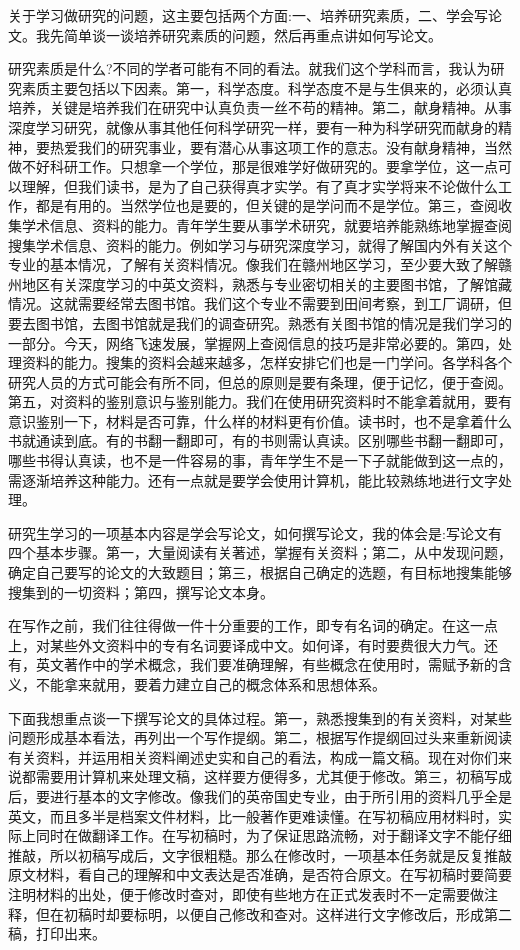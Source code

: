 \documentclass[11pt]{article}
\begin{document}
关于学习做研究的问题，这主要包括两个方面:一、培养研究素质，二、学会写论文。我先简单谈一谈培养研究素质的问题，然后再重点讲如何写论文。

研究素质是什么?不同的学者可能有不同的看法。就我们这个学科而言，我认为研究素质主要包括以下因素。第一，科学态度。科学态度不是与生俱来的，必须认真培养，关键是培养我们在研究中认真负责一丝不苟的精神。第二，献身精神。从事深度学习研究，就像从事其他任何科学研究一样，要有一种为科学研究而献身的精神，要热爱我们的研究事业，要有潜心从事这项工作的意志。没有献身精神，当然做不好科研工作。只想拿一个学位，那是很难学好做研究的。要拿学位，这一点可以理解，但我们读书，是为了自己获得真才实学。有了真才实学将来不论做什么工作，都是有用的。当然学位也是要的，但关键的是学问而不是学位。第三，查阅收集学术信息、资料的能力。青年学生要从事学术研究，就要培养能熟练地掌握查阅搜集学术信息、资料的能力。例如学习与研究深度学习，就得了解国内外有关这个专业的基本情况，了解有关资料情况。像我们在赣州地区学习，至少要大致了解赣州地区有关深度学习的中英文资料，熟悉与专业密切相关的主要图书馆，了解馆藏情况。这就需要经常去图书馆。我们这个专业不需要到田间考察，到工厂调研，但要去图书馆，去图书馆就是我们的调查研究。熟悉有关图书馆的情况是我们学习的一部分。今天，网络飞速发展，掌握网上查阅信息的技巧是非常必要的。第四，处理资料的能力。搜集的资料会越来越多，怎样安排它们也是一门学问。各学科各个研究人员的方式可能会有所不同，但总的原则是要有条理，便于记忆，便于查阅。第五，对资料的鉴别意识与鉴别能力。我们在使用研究资料时不能拿着就用，要有意识鉴别一下，材料是否可靠，什么样的材料更有价值。读书时，也不是拿着什么书就通读到底。有的书翻一翻即可，有的书则需认真读。区别哪些书翻一翻即可，哪些书得认真读，也不是一件容易的事，青年学生不是一下子就能做到这一点的，需逐渐培养这种能力。还有一点就是要学会使用计算机，能比较熟练地进行文字处理。

研究生学习的一项基本内容是学会写论文，如何撰写论文，我的体会是:写论文有四个基本步骤。第一，大量阅读有关著述，掌握有关资料；第二，从中发现问题，确定自己要写的论文的大致题目；第三，根据自己确定的选题，有目标地搜集能够搜集到的一切资料；第四，撰写论文本身。

在写作之前，我们往往得做一件十分重要的工作，即专有名词的确定。在这一点上，对某些外文资料中的专有名词要译成中文。如何译，有时要费很大力气。还有，英文著作中的学术概念，我们要准确理解，有些概念在使用时，需赋予新的含义，不能拿来就用，要着力建立自己的概念体系和思想体系。

下面我想重点谈一下撰写论文的具体过程。第一，熟悉搜集到的有关资料，对某些问题形成基本看法，再列出一个写作提纲。第二，根据写作提纲回过头来重新阅读有关资料，并运用相关资料阐述史实和自己的看法，构成一篇文稿。现在对你们来说都需要用计算机来处理文稿，这样要方便得多，尤其便于修改。第三，初稿写成后，要进行基本的文字修改。像我们的英帝国史专业，由于所引用的资料几乎全是英文，而且多半是档案文件材料，比一般著作更难读懂。在写初稿应用材料时，实际上同时在做翻译工作。在写初稿时，为了保证思路流畅，对于翻译文字不能仔细推敲，所以初稿写成后，文字很粗糙。那么在修改时，一项基本任务就是反复推敲原文材料，看自己的理解和中文表达是否准确，是否符合原文。在写初稿时要简要注明材料的出处，便于修改时查对，即使有些地方在正式发表时不一定需要做注释，但在初稿时却要标明，以便自己修改和查对。这样进行文字修改后，形成第二稿，打印出来。
\end{document}
